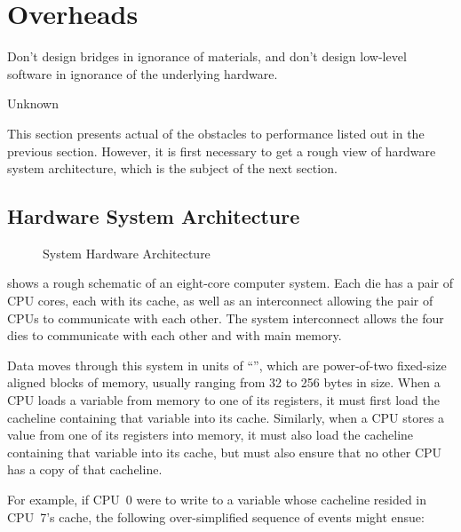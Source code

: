 
\section{Overheads}
\label{sec:cpu:Overheads}
%
\epigraph{Don't design bridges in ignorance of materials, and don't design
	  low-level software in ignorance of the underlying hardware.}
	 {Unknown}

This section presents actual  of the obstacles to performance
listed out in the previous section.
However, it is first necessary to get a rough view of hardware system
architecture, which is the subject of the next section.

\subsection{Hardware System Architecture}
\label{sec:cpu:Hardware System Architecture}

\begin{figure}
\centering
{}
\caption{System Hardware Architecture}
\label{fig:cpu:System Hardware Architecture}
\end{figure}

shows a rough schematic of an eight-core computer system.
Each die has a pair of CPU cores, each with its cache, as well as an
interconnect allowing the pair of CPUs to communicate with each other.
The system interconnect allows the four dies to communicate with each
other and with main memory.

Data moves through this system in units of ``'', which
are power-of-two fixed-size aligned blocks of memory, usually ranging
from 32 to 256 bytes in size.
When a CPU loads a variable from memory to one of its registers, it must
first load the cacheline containing that variable into its cache.
Similarly, when a CPU stores a value from one of its registers into
memory, it must also load the cacheline containing that variable into
its cache, but must also ensure that no other CPU has a copy of that
cacheline.

For example, if CPU~0 were to write to a variable whose cacheline
resided in CPU~7's cache, the following over-simplified sequence of
events might ensue:

